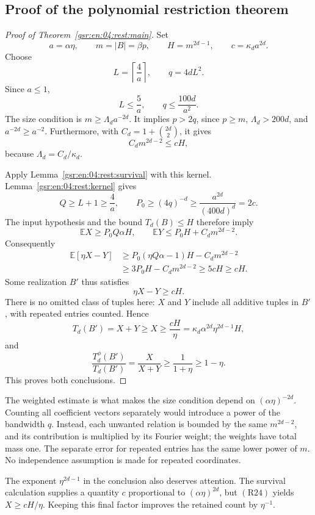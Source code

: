 \documentclass[11pt,letterpaper]{article}
\numberwithin{equation}{section}
\theoremstyle{definition}
\theoremstyle{remark}
\newcommand{\E}{\mathbb E}
\newcommand{\1}{\mathbf 1}
\newcommand{\abs}[1]{\left|#1\right|}
\begin{document}
\subsection{Proof of the polynomial restriction theorem}

\begin{proof}[Proof of Theorem~\ref{gsr:en:04:rest:main}]
Set
\[
 a=\alpha\eta,\qquad m=\abs B=\beta p,\qquad
 H=m^{2d-1},\qquad c=\kappa_da^{2d}.
 \tag{R17}
\]
Choose
\[
 L=\left\lceil\frac4a\right\rceil,\qquad q=4dL^2.
 \tag{R18}
\]
Since \(a\leq1\),
\[
 L\leq\frac5a,\qquad q\leq\frac{100d}{a^2}.
 \tag{R19}
\]
The size condition is \(m\geq\Lambda_da^{-2d}\).
It implies \(p>2q\), since \(p\geq m\),
\(\Lambda_d>200d\), and \(a^{-2d}\geq a^{-2}\).
Furthermore, with \(C_d=1+\binom{2d}{2}\), it gives
\[
 C_dm^{2d-2}\leq cH,
 \tag{R20}
\]
because \(\Lambda_d=C_d/\kappa_d\).

Apply Lemma~\ref{gsr:en:04:rest:survival} with this kernel.
Lemma~\ref{gsr:en:04:rest:kernel} gives
\[
 Q\geq L+1\geq\frac4a,\qquad
 P_0\geq(4q)^{-d}
       \geq\frac{a^{2d}}{(400d)^d}=2c.
 \tag{R21}
\]
The input hypothesis and the bound \(T_d(B)\leq H\)
therefore imply
\[
 \E X\geq P_0Q\alpha H,\qquad
 \E Y\leq P_0H+C_dm^{2d-2}.
 \tag{R22}
\]
Consequently
\[
 \begin{aligned}
 \E[\eta X-Y]
 &\geq P_0(\eta Q\alpha-1)H-C_dm^{2d-2}\\
 &\geq3P_0H-C_dm^{2d-2}
 \geq5cH\geq cH.
 \end{aligned}
 \tag{R23}
\]
Some realization \(B'\) thus satisfies
\[
 \eta X-Y\geq cH.
 \tag{R24}
\]
There is no omitted class of tuples here: \(X\) and \(Y\)
include all additive tuples in \(B'\), with repeated
entries counted.  Hence
\[
 T_d(B')=X+Y\geq X\geq\frac{cH}{\eta}
       =\kappa_d\alpha^{2d}\eta^{2d-1}H,
 \tag{R25}
\]
and
\[
 \frac{T_d^\phi(B')}{T_d(B')}
       =\frac{X}{X+Y}\geq\frac1{1+\eta}\geq1-\eta.
 \tag{R26}
\]
This proves both conclusions.
\end{proof}

The weighted estimate is what makes the size condition depend
on \((\alpha\eta)^{-2d}\).  Counting all coefficient vectors
separately would introduce a power of the bandwidth \(q\).
Instead, each unwanted relation is bounded by the same
\(m^{2d-2}\), and its contribution is multiplied by its
Fourier weight; the weights have total mass one.  The
separate error for repeated entries has the same lower
power of \(m\).  No independence assumption is made for
repeated coordinates.

The exponent \(\eta^{2d-1}\) in the conclusion also deserves
attention.  The survival calculation supplies a quantity
\(c\) proportional to \((\alpha\eta)^{2d}\), but
\(\mathrm{(R24)}\) yields \(X\geq cH/\eta\).
Keeping this final factor improves the retained count by
\(\eta^{-1}\).
\end{document}
